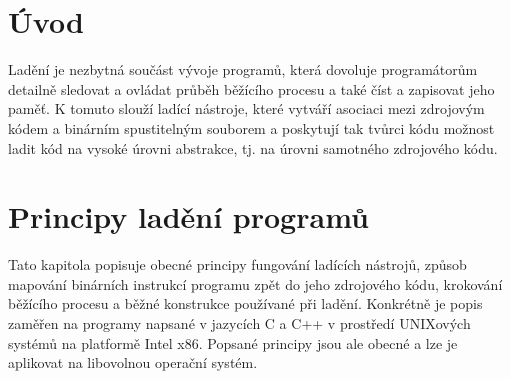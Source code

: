 \documentclass[bc,male,java,dept460]{diploma}						%
\begin{document}
\MakeTitlePages

\tableofcontents
\cleardoublepage	%

\listoftables
\cleardoublepage	%

\listoffigures
\cleardoublepage	%

\lstlistoflistings
\cleardoublepage	%

\section{Úvod}
	Ladění je nezbytná součást vývoje programů, která dovoluje programátorům detailně sledovat a ovládat průběh běžícího procesu a také
	číst a zapisovat jeho paměť. K tomuto slouží ladící nástroje, které vytváří asociaci mezi zdrojovým kódem a binárním spustitelným
	souborem a poskytují tak tvůrci kódu možnost ladit kód na vysoké úrovni abstrakce, tj. na úrovni samotného zdrojového kódu.
	
\section{Principy ladění programů}
	Tato kapitola popisuje obecné principy fungování ladících nástrojů, způsob mapování binárních instrukcí programu zpět do jeho zdrojového kódu,
	krokování běžícího procesu a běžné konstrukce používané při ladění. Konkrétně je popis zaměřen na programy napsané v jazycích C a C++
	v prostředí UNIXových systémů na platformě Intel x86. Popsané principy jsou ale obecné a lze je aplikovat na libovolnou operační systém.
		
\end{document}
